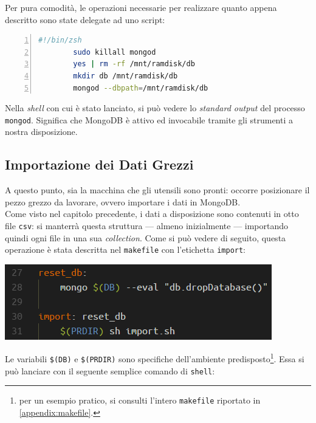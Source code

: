 	Per pura comodità, le operazioni necessarie per realizzare quanto appena descritto sono state delegate ad uno script:

	\begin{lstlisting}[language=bash,caption={script di lancio di un server MongoDB}, numbers=left, stepnumber=1]
		#!/bin/zsh
		sudo killall mongod
		yes | rm -rf /mnt/ramdisk/db
		mkdir db /mnt/ramdisk/db
		mongod --dbpath=/mnt/ramdisk/db
	\end{lstlisting}

	\vspace{0.3cm}

	Nella \textit{shell} con cui è stato lanciato, si può vedere lo \textit{standard output} del processo \texttt{mongod}. Significa che MongoDB è attivo ed invocabile tramite gli strumenti a nostra disposizione.

	\subsection{Importazione dei Dati Grezzi}

	A questo punto, sia la macchina che gli utensili sono pronti: occorre posizionare il pezzo grezzo da lavorare, ovvero importare i dati in MongoDB. \\

	Come visto nel capitolo precedente, i dati a disposizione sono contenuti in otto file \texttt{csv}: si manterrà questa struttura --- almeno inizialmente --- importando quindi ogni file in una sua \textit{collection}. Come si può vedere di seguito, questa operazione è stata descritta nel \texttt{makefile} con l'etichetta \texttt{import}:

	\begin{center}
		\includegraphics[scale=0.7]{img/import.png}
	\end{center}

	Le variabili \texttt{\$(DB)} e \texttt{\$(PRDIR)} sono specifiche dell'ambiente predisposto\footnote{per un esempio pratico, si consulti l'intero \texttt{makefile} riportato in \ref{appendix:makefile}.}. Essa si può lanciare con il seguente semplice comando di \texttt{shell}:

